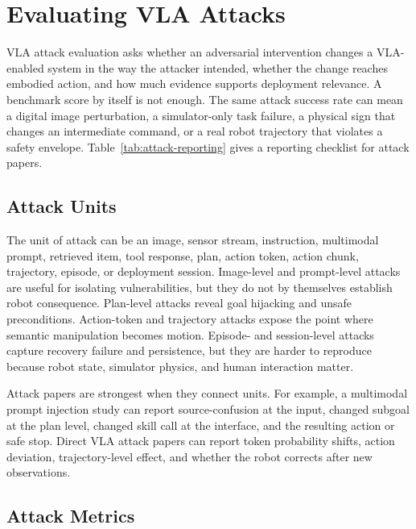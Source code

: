 \section{Evaluating VLA Attacks}
\label{sec:evaluation}

VLA attack evaluation asks whether an adversarial intervention changes a VLA-enabled system in the way the attacker intended, whether the change reaches embodied action, and how much evidence supports deployment relevance. A benchmark score by itself is not enough. The same attack success rate can mean a digital image perturbation, a simulator-only task failure, a physical sign that changes an intermediate command, or a real robot trajectory that violates a safety envelope. Table~\ref{tab:attack-reporting} gives a reporting checklist for attack papers.



\subsection{Attack Units}

The unit of attack can be an image, sensor stream, instruction, multimodal prompt, retrieved item, tool response, plan, action token, action chunk, trajectory, episode, or deployment session. Image-level and prompt-level attacks are useful for isolating vulnerabilities, but they do not by themselves establish robot consequence. Plan-level attacks reveal goal hijacking and unsafe preconditions. Action-token and trajectory attacks expose the point where semantic manipulation becomes motion. Episode- and session-level attacks capture recovery failure and persistence, but they are harder to reproduce because robot state, simulator physics, and human interaction matter.

Attack papers are strongest when they connect units. For example, a multimodal prompt injection study can report source-confusion at the input, changed subgoal at the plan level, changed skill call at the interface, and the resulting action or safe stop. Direct VLA attack papers can report token probability shifts, action deviation, trajectory-level effect, and whether the robot corrects after new observations.

\subsection{Attack Metrics}

